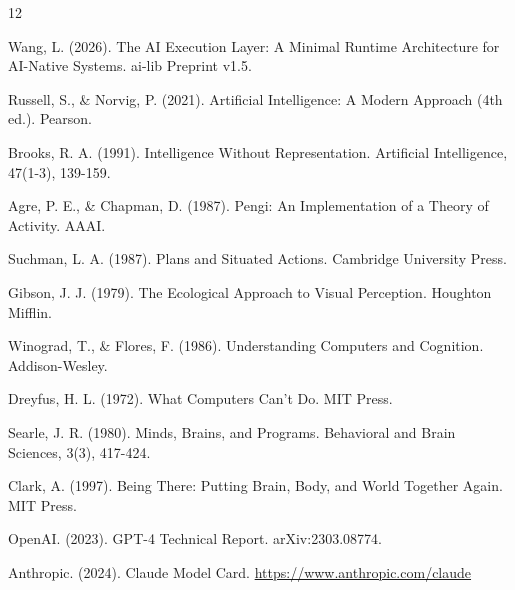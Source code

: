 
\begin{thebibliography}{12}

Wang, L. (2026). The AI Execution Layer: A Minimal Runtime Architecture for AI-Native Systems. ai-lib Preprint v1.5.

Russell, S., \& Norvig, P. (2021). Artificial Intelligence: A Modern Approach (4th ed.). Pearson.

Brooks, R. A. (1991). Intelligence Without Representation. Artificial Intelligence, 47(1-3), 139-159.

Agre, P. E., \& Chapman, D. (1987). Pengi: An Implementation of a Theory of Activity. AAAI.

Suchman, L. A. (1987). Plans and Situated Actions. Cambridge University Press.

Gibson, J. J. (1979). The Ecological Approach to Visual Perception. Houghton Mifflin.

Winograd, T., \& Flores, F. (1986). Understanding Computers and Cognition. Addison-Wesley.

Dreyfus, H. L. (1972). What Computers Can't Do. MIT Press.

Searle, J. R. (1980). Minds, Brains, and Programs. Behavioral and Brain Sciences, 3(3), 417-424.

Clark, A. (1997). Being There: Putting Brain, Body, and World Together Again. MIT Press.

OpenAI. (2023). GPT-4 Technical Report. arXiv:2303.08774.

Anthropic. (2024). Claude Model Card. \url{https://www.anthropic.com/claude}

\end{thebibliography}
